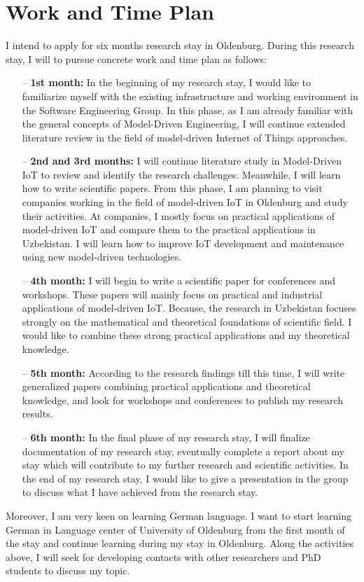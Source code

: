 \documentclass[10pt, oneside]{article}
\begin{document}
\section{Work and Time Plan}
I intend to apply for six months research stay in Oldenburg. During this research stay, I will to pursue concrete work and time plan as follows:
\begin{itemize}
\item[--] \textbf{1st month:} In the beginning of my research stay, I would like to familiarize myself with the existing infrastructure and working environment in the Software Engineering Group. In this phase, as I am already familiar with the general concepts of Model-Driven Engineering, I will continue extended literature review in the field of model-driven Internet of Things approaches.
\item[--] \textbf{2nd and 3rd months:} I will continue literature study in Model-Driven IoT to review and identify the research challenges. Meanwhile, I will learn how to write scientific papers. From this phase, I am planning to visit companies working in the field of model-driven IoT in Oldenburg and study their activities. At companies, I mostly focus on practical applications of model-driven IoT and compare them to the practical applications in Uzbekistan. I will learn how to improve IoT development and maintenance using new model-driven technologies.
\item[--] \textbf{4th month:} I will begin to write a scientific paper for conferences and workshops. These papers will mainly focus on practical and industrial applications of model-driven IoT. Because, the research in Uzbekistan focuses strongly on the mathematical and theoretical foundations of scientific field. I would like to combine these strong practical applications and my theoretical knowledge.
\item[--] \textbf{5th month:} According to the research findings till this time, I will write generalized papers combining practical applications and theoretical knowledge, and look for workshops and conferences to publish my research results. 
\item[--] \textbf{6th month:} In the final phase of my research stay, I will finalize documentation of my research stay, eventually complete a report about my stay which will contribute to my further research and scientific activities. In the end of my research stay, I would like to give a presentation in the group to discuss what I have achieved from the research stay.
\end{itemize}
Moreover, I am very keen on learning German language. I want to start learning German in Language center of University of Oldenburg from the first month of the stay and continue learning during my stay in Oldenburg. Along the activities above, I will seek for developing contacts with other researchers and PhD students to discuss my topic.
\end{document}
